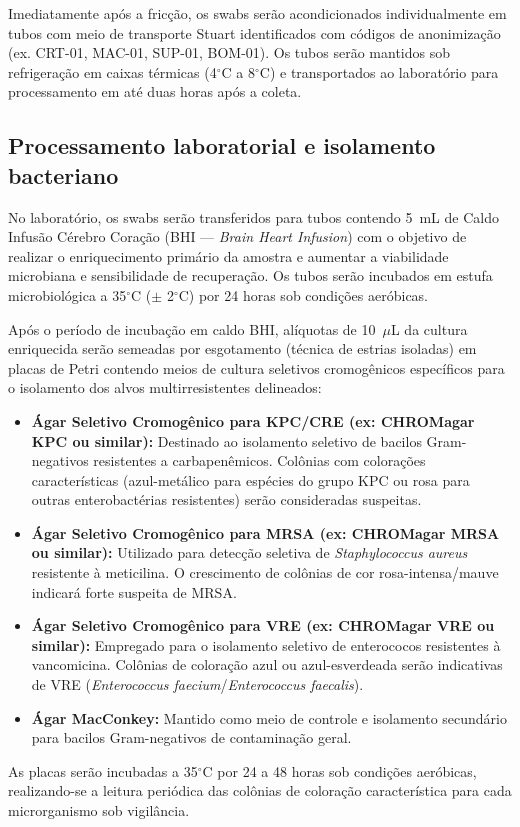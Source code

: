 \documentclass[12pt,a4paper]{article}
\newcommand{\celsius}{$^\circ$C}
\begin{document}
Imediatamente após a fricção, os swabs serão acondicionados individualmente em tubos com meio de transporte Stuart identificados com códigos de anonimização (ex. CRT-01, MAC-01, SUP-01, BOM-01). Os tubos serão mantidos sob refrigeração em caixas térmicas (4\celsius{} a 8\celsius{}) e transportados ao laboratório para processamento em até duas horas após a coleta.

\subsection{Processamento laboratorial e isolamento bacteriano}
No laboratório, os swabs serão transferidos para tubos contendo 5~mL de Caldo Infusão Cérebro Coração (BHI --- \textit{Brain Heart Infusion}) com o objetivo de realizar o enriquecimento primário da amostra e aumentar a viabilidade microbiana e sensibilidade de recuperação. Os tubos serão incubados em estufa microbiológica a 35\celsius{} ($\pm$ 2\celsius{}) por 24 horas sob condições aeróbicas.

Após o período de incubação em caldo BHI, alíquotas de 10~$\mu$L da cultura enriquecida serão semeadas por esgotamento (técnica de estrias isoladas) em placas de Petri contendo meios de cultura seletivos cromogênicos específicos para o isolamento dos alvos multirresistentes delineados:
\begin{itemize}
    \item \textbf{Ágar Seletivo Cromogênico para KPC/CRE (ex: CHROMagar KPC ou similar):} Destinado ao isolamento seletivo de bacilos Gram-negativos resistentes a carbapenêmicos. Colônias com colorações características (azul-metálico para espécies do grupo KPC ou rosa para outras enterobactérias resistentes) serão consideradas suspeitas.
    \item \textbf{Ágar Seletivo Cromogênico para MRSA (ex: CHROMagar MRSA ou similar):} Utilizado para detecção seletiva de \textit{Staphylococcus aureus} resistente à meticilina. O crescimento de colônias de cor rosa-intensa/mauve indicará forte suspeita de MRSA.
    \item \textbf{Ágar Seletivo Cromogênico para VRE (ex: CHROMagar VRE ou similar):} Empregado para o isolamento seletivo de enterococos resistentes à vancomicina. Colônias de coloração azul ou azul-esverdeada serão indicativas de VRE (\textit{Enterococcus faecium}/\textit{Enterococcus faecalis}).
    \item \textbf{Ágar MacConkey:} Mantido como meio de controle e isolamento secundário para bacilos Gram-negativos de contaminação geral.
\end{itemize}
As placas serão incubadas a 35\celsius{} por 24 a 48 horas sob condições aeróbicas, realizando-se a leitura periódica das colônias de coloração característica para cada microrganismo sob vigilância.
\end{document}
